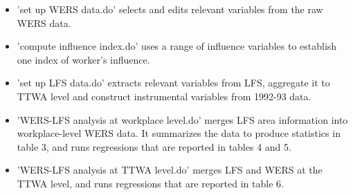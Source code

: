 \documentclass[12pt]{article}
\begin{document}
\begin{itemize}
\item 'set up WERS data.do' selects and edits relevant variables from the raw WERS data.
\item 'compute influence index.do' uses a range of influence variables to establish one index of worker's influence.
\item 'set up LFS data.do' extracts relevant variables from LFS, aggregate it to TTWA level and construct instrumental variables from 1992-93 data.
\item 'WERS-LFS analysis at workplace level.do'  merges LFS area information into workplace-level WERS data. It summarizes the data to produce statistics in table 3, and runs regressions that are reported in tables 4 and 5.
\item 'WERS-LFS analysis at TTWA level.do' merges LFS and WERS at the TTWA level, and runs regressions that are reported in table 6. 
\end{itemize}



\end{document}
